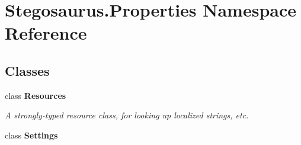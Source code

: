 \hypertarget{namespace_stegosaurus_1_1_properties}{}\section{Stegosaurus.\+Properties Namespace Reference}
\label{namespace_stegosaurus_1_1_properties}
\subsection*{Classes}
\begin{DoxyCompactItemize}
\item 
class {\bfseries Resources}
\begin{DoxyCompactList}\small\item\em A strongly-\/typed resource class, for looking up localized strings, etc. \end{DoxyCompactList}\item 
class {\bfseries Settings}
\end{DoxyCompactItemize}
